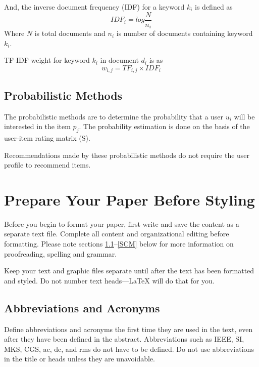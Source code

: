 \documentclass[conference]{IEEEtran}
\begin{document}
And, the inverse document frequency (IDF) for a keyword \(k_{i}\) is defined as
\begin{equation}
    IDF_{i} = log\frac{N}{n_{i}}
\end{equation}
Where \(N\) is total documents and \(n_{i}\) is number of documents containing keyword \(k_{i}\).

TF-IDF weight for keyword \(k_{i}\) in document \(d_{i}\) is as
\begin{equation}
    w_{i,j} = {TF_{i,j}} \times {IDF_{i}}
\end{equation}

\subsection{Probabilistic Methods}\label{BB}
The probabilistic methods are to determine the probability that a user \(u_{i}\) will be interested in the item \(p_{j}\). The probability estimation is done on the basis of the user-item rating matrix (S).

Recommendations made by these probabilistic methods do not require the user profile to recommend items.
\section{Prepare Your Paper Before Styling}
Before you begin to format your paper, first write and save the content as a 
separate text file. Complete all content and organizational editing before 
formatting. Please note sections \ref{AA}--\ref{SCM} below for more information on 
proofreading, spelling and grammar.

Keep your text and graphic files separate until after the text has been 
formatted and styled. Do not number text heads---{\LaTeX} will do that 
for you.

\subsection{Abbreviations and Acronyms}\label{AA}
Define abbreviations and acronyms the first time they are used in the text, 
even after they have been defined in the abstract. Abbreviations such as 
IEEE, SI, MKS, CGS, ac, dc, and rms do not have to be defined. Do not use 
abbreviations in the title or heads unless they are unavoidable.
\end{document}
